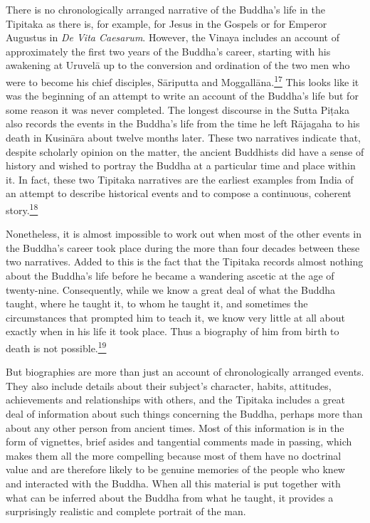 There is no chronologically arranged narrative of the Buddha's life in
the Tipitaka as there is, for example, for Jesus in the Gospels or for
Emperor Augustus in \emph{De Vita Caesarum}. However, the Vinaya
includes an account of approximately the first two years of the Buddha's
career, starting with his awakening at Uruvelā up to the conversion and
ordination of the two men who were to become his chief disciples,
Sāriputta and
Moggallāna.\label{footprints_split_005.html_fnref17}\hyperref[footprints_split_024.htmlux5cux23fn17]{\textsuperscript{17}}
This looks like it was the beginning of an attempt to write an account
of the Buddha's life but for some reason it was never completed. The
longest discourse in the Sutta Piṭaka also records the events in the
Buddha's life from the time he left Rājagaha to his death in Kusināra
about twelve months later. These two narratives indicate that, despite
scholarly opinion on the matter, the ancient Buddhists did have a sense
of history and wished to portray the Buddha at a particular time and
place within it. In fact, these two Tipitaka narratives are the earliest
examples from India of an attempt to describe historical events and to
compose a continuous, coherent
story.\label{footprints_split_005.html_fnref18}\hyperref[footprints_split_024.htmlux5cux23fn18]{\textsuperscript{18}}

Nonetheless, it is almost impossible to work out when most of the other
events in the Buddha's career took place during the more than four
decades between these two narratives. Added to this is the fact that the
Tipitaka records almost nothing about the Buddha's life before he became
a wandering ascetic at the age of twenty-nine. Consequently, while we
know a great deal of what the Buddha taught, where he taught it, to whom
he taught it, and sometimes the circumstances that prompted him to teach
it, we know very little at all about exactly when in his life it took
place. Thus a biography of him from birth to death is not
possible.\label{footprints_split_005.html_fnref19}\hyperref[footprints_split_024.htmlux5cux23fn19]{\textsuperscript{19}}

But biographies are more than just an account of chronologically
arranged events. They also include details about their subject's
character, habits, attitudes, achievements and relationships with
others, and the Tipitaka includes a great deal of information about such
things concerning the Buddha, perhaps more than about any other person
from ancient times. Most of this information is in the form of
vignettes, brief asides and tangential comments made in passing, which
makes them all the more compelling because most of them have no
doctrinal value and are therefore likely to be genuine memories of the
people who knew and interacted with the Buddha. When all this material
is put together with what can be inferred about the Buddha from what he
taught, it provides a surprisingly realistic and complete portrait of
the man.

